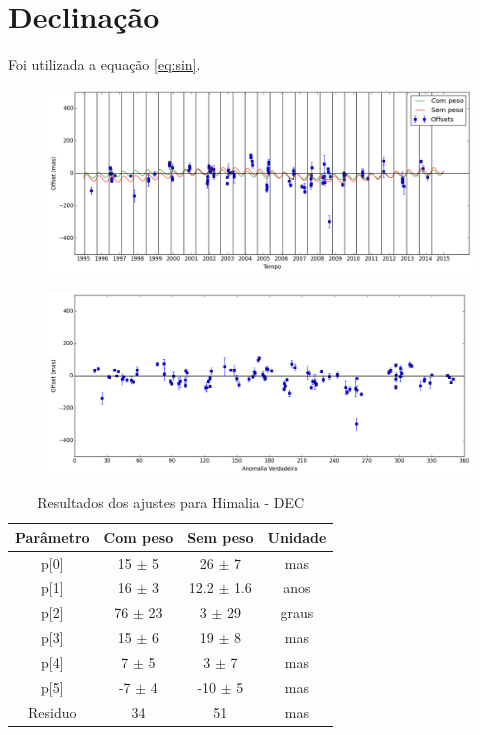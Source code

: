 \documentclass[11pt,a4paper]{report}
\begin{document}
\section*{Declinação}

Foi utilizada a equação \ref{eq:sin}.

\begin{figure}[h]
\includegraphics[scale=0.45]{Himalia/DEC.png} 
\end{figure}

\begin{figure}[h]
\includegraphics[scale=0.45]{Himalia/DEC_anom.png}  
\end{figure}

\begin{table}[h!]
\caption{\label{Tab: Himalia-DEC} Resultados dos ajustes para Himalia - DEC}
\begin{centering}
\begin{tabular}{cccc}
\hline
\hline
Parâmetro & Com peso & Sem peso & Unidade\tabularnewline
\hline
p[0] & 15 $\pm$ 5 & 26 $\pm$ 7 & mas\\
p[1] & 16 $\pm$ 3 & 12.2 $\pm$ 1.6 & anos\\
p[2] & 76 $\pm$ 23 & 3 $\pm$ 29 & graus\\
p[3] & 15 $\pm$ 6 & 19 $\pm$ 8 & mas\\
p[4] & 7 $\pm$ 5 & 3 $\pm$ 7 & mas\\
p[5] & -7 $\pm$ 4 & -10 $\pm$ 5 & mas\\
Residuo & 34 & 51 & mas\\
\hline 
\end{tabular} 
\par\end{centering}
\end{table}
\end{document}
